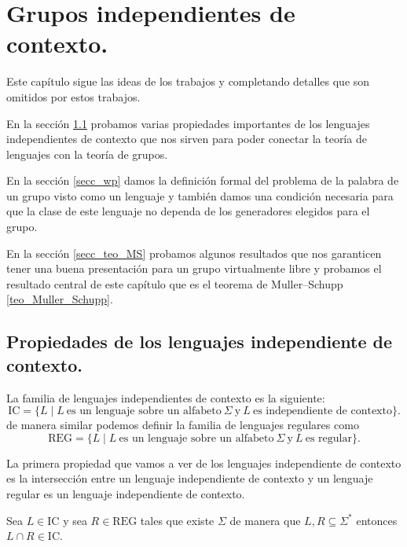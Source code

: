 \documentclass[tesis.tex]{subfiles}
\begin{document}
\chapter{Grupos independientes de contexto.}
Este capítulo sigue las ideas de los trabajos \cite{muller1983groups} y \cite{muller1985theory} completando detalles que son omitidos por estos trabajos.

En la sección \ref{secc_grp_ic} probamos varias propiedades importantes de los lenguajes independientes de contexto que nos sirven para poder conectar la teoría de lenguajes con la teoría de grupos.

En la sección \ref{secc_wp} damos la definición formal del problema de la palabra de un grupo visto como un lenguaje y también damos una condición necesaria para que la clase de este lenguaje no dependa de los generadores elegidos para el grupo.


En la sección \ref{secc_teo_MS} probamos algunos resultados que nos garanticen tener una buena presentación para un grupo virtualmente libre y probamos el resultado central de este capítulo que es el teorema de Muller--Schupp \ref{teo_Muller_Schupp}.


\section{Propiedades de los lenguajes independiente de contexto.}\label{secc_grp_ic}

La familia de lenguajes independientes de contexto es la siguiente:
\[
	\text{IC} = \{  L \mid L  \ \text{es un lenguaje sobre un alfabeto} \ \Sigma \ \text{y} \ L \  \text{es independiente de contexto} \}.
\]
de manera similar podemos definir la familia de lenguajes regulares como
\[
	\text{REG} = \{  L \mid L  \ \text{es un lenguaje sobre un alfabeto} \ \Sigma \ \text{y} \ L \  \text{es regular} \}.
\]

La primera propiedad que vamos a ver de los lenguajes independiente de contexto es la intersección entre un lenguaje independiente de contexto y un lenguaje regular es un lenguaje independiente de contexto.

\begin{prop}\label{intersecciones-reg-ic}
	Sea $L \in \text{IC}$ y sea $R \in \text{REG}$ tales que existe $\Sigma$ de manera que $L,R \subseteq \Sigma^{*}$ entonces $L \cap R \in \text{IC}$.	
\end{prop}
\end{document}
